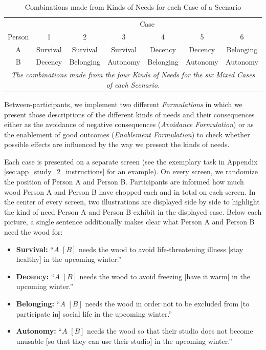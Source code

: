 \documentclass[egregdoesnotlikesansseriftitles]{scrartcl}
\begin{document}
\begin{table}[ht!]
   \centering
   \caption{Combinations made from Kinds of Needs for each Case of a Scenario}\label{tab:combinations}
   \begin{tabular}{ccccccc}\hline
               & \multicolumn{6}{c}{Case}                                                       \\\cline{2-7}
      Person   & 1          & 2           & 3          & 4           & 5          & 6           \\\hline\hline
      A        & Survival   & Survival    & Survival   & Decency     & Decency    & Belonging   \\
      B        & Decency    & Belonging   & Autonomy   & Belonging   & Autonomy   & Autonomy    \\\hline
   \multicolumn{7}{p{14.2cm}}{\footnotesize{\textit{The combinations made from the four Kinds of Needs for the six Mixed Cases of each Scenario.}}}
   \end{tabular}
\end{table}

Between-participants, we implement two different \textit{Formulations} in which we present those descriptions of the different kinds of needs and their consequences either as the avoidance of negative consequences (\textit{Avoidance Formulation}) or as the enablement of good outcomes (\textit{Enablement Formulation}) to check whether possible effects are influenced by the way we present the kinds of needs.

Each case is presented on a separate screen (see the exemplary task in Appendix \ref{sec:app_study_2_instructions} for an example).
On every screen, we randomize the position of Person A and Person B.
Participants are informed how much wood Person A and Person B have chopped each and in total on each screen.
In the center of every screen, two illustrations are displayed side by side to highlight the kind of need Person A and Person B exhibit in the displayed case.
Below each picture, a single sentence additionally makes clear what Person A and Person B need the wood for:

\begin{itemize}
   \item \textbf{Survival:} ``$A$ $[B]$ needs the wood to avoid life-threatening illness [stay healthy] in the upcoming winter.''
   \item \textbf{Decency:} ``$A$ $[B]$ needs the wood to avoid freezing [have it warm] in the upcoming winter.''
   \item \textbf{Belonging:} ``$A$ $[B]$ needs the wood in order not to be excluded from [to participate in] social life in the upcoming winter.''
   \item \textbf{Autonomy:} ``$A$ $[B]$ needs the wood so that their studio does not become unusable [so that they can use their studio] in the upcoming winter.''
\end{itemize}
\end{document}
